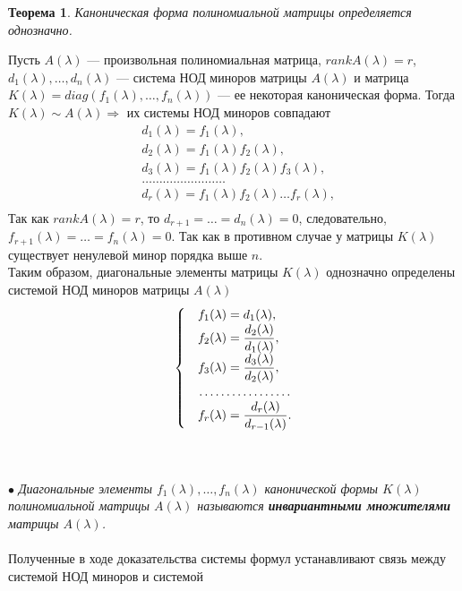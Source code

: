 \newtheorem*{th12_2_1}{Теорема}\begin{th12_2_1}Каноническая форма полиномиальной матрицы определяется однозначно.
\end{th12_2_1}\begin{Proof}
	Пусть $A(\lambda)$ --- произвольная полиномиальная матрица, $rankA(\lambda) = r$, $d_1(\lambda),\dots,d_n(\lambda)$ --- система НОД миноров матрицы $A(\lambda)$ и матрица $K(\lambda) = diag(f_1(\lambda),\dots,f_n(\lambda))$ --- ее некоторая каноническая форма. Тогда $K(\lambda)\sim A(\lambda) \Rightarrow$ их системы НОД миноров совпадают
	\begin{align*}
		&d_1(\lambda) = f_1(\lambda), \\
		&d_2(\lambda) = f_1(\lambda)f_2(\lambda),\\
		&d_3(\lambda)=f_1(\lambda)f_2(\lambda)f_3(\lambda),\\
		&\dots\dots\dots\dots\dots\dots\dots\dots\\
		&d_r(\lambda) = f_1(\lambda)f_2(\lambda)\dots f_r(\lambda),\\
	\end{align*}
	Так как $rankA(\lambda) = r$, то $d_{r+1}=\ldots=d_n(\lambda) = 0$, следовательно,  $f_{r+1}(\lambda) = \ldots = f_n(\lambda) = 0$. Так как в противном случае у матрицы $K(\lambda)$ существует ненулевой минор порядка выше $n$.\\
	Таким образом, диагональные элементы матрицы $K(\lambda)$ однозначно определены системой НОД миноров матрицы $A(\lambda)$\\
	$$\begin{cases}
		&f_1(\lambda) = d_1(\lambda),\\
		&f_2(\lambda) = \dfrac{d_2(\lambda)}{d_1(\lambda)},\\
		&f_3(\lambda) = \dfrac{d_3(\lambda)}{d_2(\lambda)},\\
		&\dotfill\\
		&f_r(\lambda) = \dfrac{d_r(\lambda)}{d_{r-1}(\lambda)}.
	\end{cases}$$
\end{Proof}\\\\
$\bullet$ \textit{Диагональные элементы $f_1(\lambda),\dots,f_n(\lambda)$ канонической формы $K(\lambda)$ полиномиальной матрицы $A(\lambda)$ называются \textbf{инвариантными множителями} матрицы $A(\lambda)$.}\\\\
Полученные в ходе доказательства системы формул устанавливают связь между системой НОД миноров и системой
